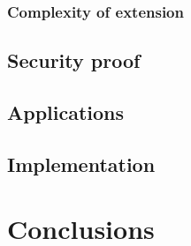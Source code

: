 \documentclass[12pt]{article}
\newcommand\blankpage{%
    \null
    \thispagestyle{empty}%
    \addtocounter{page}{-1}%
    \newpage}
\begin{document}
\subsubsection{Complexity of extension}

\subsection{Security proof}

\subsection{Applications}

\subsection{Implementation}

\section{Conclusions}

\pagebreak

\blankpage
\end{document}
